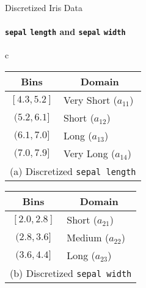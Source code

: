\begin{frame}{Discretized Iris Data}
\framesubtitle{\texttt{sepal} {\tt length} and \texttt{sepal} {\tt width}}

  {\begin{tabular}{c}
{
{
    \label{tab:class:prob:slbin}
\renewcommand{\arraystretch}{1.1} 
\begin{tabular}{|c|l|}
\hline
Bins & \multicolumn{1}{c|}{Domain} \\ \hline
$[4.3, 5.2]$ & Very Short ($a_{11}$) \\
$(5.2, 6.1]$ & Short ($a_{12}$) \\
$(6.1, 7.0]$ & Long ($a_{13}$)\\
$(7.0, 7.9]$ & Very Long ($a_{14}$)\\ \hline
\multicolumn{2}{c}{\fontsize{8}{8}\selectfont(a) Discretized {\tt sepal length}}\\
\end{tabular}
}
{
\label{tab:class:prob:swbin}
\renewcommand{\arraystretch}{1.1}  
\begin{tabular}{|c|l|}
  \hline
  Bins & \multicolumn{1}{c|}{Domain} \\ \hline
  $[2.0, 2.8]$ & Short ($a_{21}$) \\
  $(2.8, 3.6]$ & Medium ($a_{22}$)\\
  $(3.6, 4.4]$ & Long ($a_{23}$)\\ \hline
  \multicolumn{2}{c}{\fontsize{8}{8}\selectfont(b) Discretized {\tt sepal width}}\\
\end{tabular}
    }}
\end{tabular}}
\end{frame}



